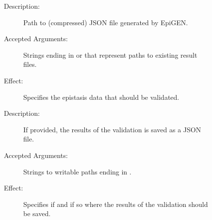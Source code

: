 \documentclass[a4paper,10pt,english]{sphinxhowto}
\begin{document}
\begin{sphinxVerbatim}[commandchars=\\\{\}]
  \PYG{p}{[} \PYG{p}{]} \PYG{p}{[} \PYG{p}{]}
\end{sphinxVerbatim}
\begin{description}
\item[{}] \leavevmode\begin{description}
\item[{}] \leavevmode\begin{description}
\item[{Description:}] \leavevmode
Path to (compressed) JSON file generated by EpiGEN.

\item[{Accepted Arguments:}] \leavevmode
Strings ending in  or  that represent paths to existing result files.

\item[{Effect:}] \leavevmode
Specifies the epistasis data that should be validated.

\end{description}

\end{description}

\item[{}] \leavevmode\begin{description}
\item[{}] \leavevmode\begin{description}
\item[{Description:}] \leavevmode
If provided, the results of the validation is saved as a JSON file.

\item[{Accepted Arguments:}] \leavevmode
Strings to writable paths ending in .

\item[{Effect:}] \leavevmode
Specifies if and if so where the results of the validation should be saved.

\end{description}

\end{description}


\end{description}
\end{document}
